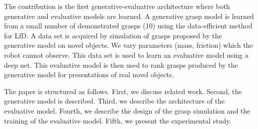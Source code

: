 The contribution is the first generative-evaluative architecture where both generative and evaluative models are learned. A generative grasp model is learned from a small number of demonstrated grasps (10) using the data-efficient method for LfD. 
A data set is acquired by simulation of  grasps proposed by the generative model on novel objects. We vary parameters (mass, friction) which the robot cannot observe. This data set is used to learn an evaluative model using a deep net. This evaluative model is then used to rank grasps produced by the generative model for presentations of real novel objects.

The paper is structured as follows. First, we discuss related work. Second, the generative model is described. Third, we describe the architecture of the evaluative model. Fourth, we describe the design of the grasp simulation and the training of the evaluative model. Fifth, we present the experimental study.

